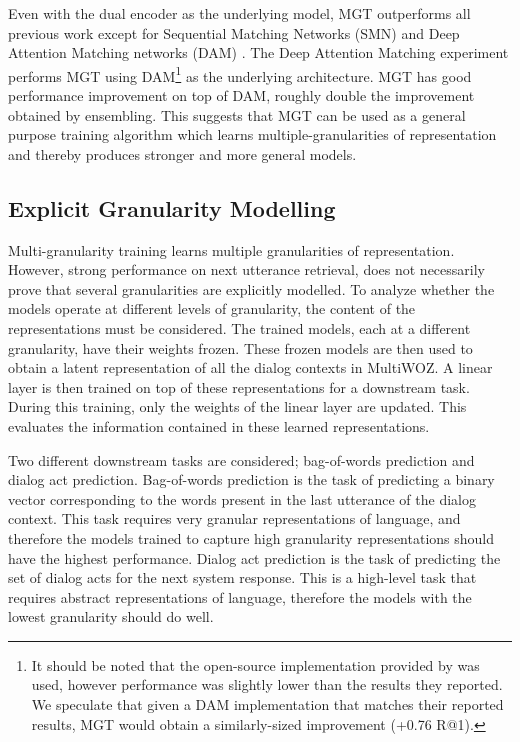 \documentclass[11pt,a4paper]{article}
\begin{document}
Even with the dual encoder as the underlying model, MGT outperforms all previous work except for Sequential Matching Networks (SMN) \citep{wu2016sequential} and Deep Attention Matching networks (DAM) \citep{zhou2018multi}. The Deep Attention Matching experiment performs MGT using DAM\footnote{It should be noted that the open-source implementation provided by \citet{zhou2018multi} was used, however performance was slightly lower than the results they reported. We speculate that given a DAM implementation that matches their reported results, MGT would obtain a similarly-sized improvement (+0.76 R@1).} as the underlying architecture. MGT has good performance improvement on top of DAM, roughly double the improvement obtained by ensembling. This suggests that MGT can be used as a general purpose training algorithm which learns multiple-granularities of representation and thereby produces stronger and more general models.








\subsection{Explicit Granularity Modelling}

Multi-granularity training learns multiple granularities of representation. However, strong performance on next utterance retrieval, does not necessarily prove that several granularities are explicitly modelled. 
To analyze whether the models operate at different levels of granularity, the content of the representations must be considered. The  trained models, each at a different granularity, have their weights frozen. These frozen models are then used to obtain a latent representation of all the dialog contexts in MultiWOZ. A linear layer is then trained on top of these representations for a downstream task. During this training, only the weights of the linear layer are updated. This evaluates the information contained in these learned representations.

Two different downstream tasks are considered; bag-of-words prediction and dialog act prediction. Bag-of-words prediction is the task of predicting a binary vector corresponding to the words present in the last utterance of the dialog context. This task requires very granular representations of language, and therefore the models trained to capture high granularity representations should have the highest performance. Dialog act prediction is the task of predicting the set of dialog acts for the next system response. This is a high-level task that requires abstract representations of language, therefore the models with the lowest granularity should do well. 
\end{document}
